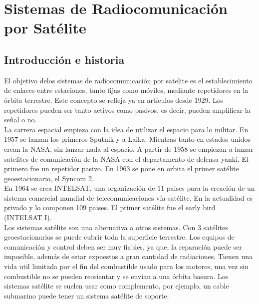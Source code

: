 \section{Sistemas de Radiocomunicación por Satélite}
\label{sec:satelite}
	\subsection{Introducción e historia}
	\label{sub:introSat}
		El objetivo delos sistemas de radiocomunicación por satelite es el establecimiento de enlaces entre estaciones, tanto fijas como móviles, mediante repetidores en la órbita terrestre. Este concepto se refleja ya en artículos desde 1929. Los repetidores pueden ser tanto activos como pasivos, es decir, pueden amplificar la señal o no.\\
		La carrera espacial empieza con la idea de utilizar el espacio para lo militar. En 1957 se lanzan los primeros Sputnik y a Laika. Mientras tanto en estados unidos crean la NASA, sin lanzar nada al espacio. A partir de 1958 se empiezan a lanzar satelites de comunicación de la NASA con el departamento de defensa yanki. El primero fue un repetidor pasivo. En 1963 se pone en orbita el primer satélite geoestacionario, el Syncom 2.\\
		En 1964 se crea INTELSAT, una organización de 11 paises para la creación de un sistema comercial mundial de telecomunicaciones vía satélite. En la actualidad es privado y lo componen 109 paises. El primer satélite fue el early bird (INTELSAT I).\\
		Los sistemas satélite son una alternativa a otros sistemas. Con 3 satélites geoestacionarios se puede cubrir toda la superficie terrestre. Los equipos de comunicación y control deben ser muy fiables, ya que, la reparación puede ser imposible, además de estar expuestos a gran cantidad de radiaciones. Tienen una vida util limitada por el fin del combustible usado para los motores, una vez sin combustible no se pueden reorientar y se envian a una órbita basura. Los sistemas satélite se suelen usar como complemento, por ejemplo, un cable submarino puede tener un sistema satélite de soporte.
